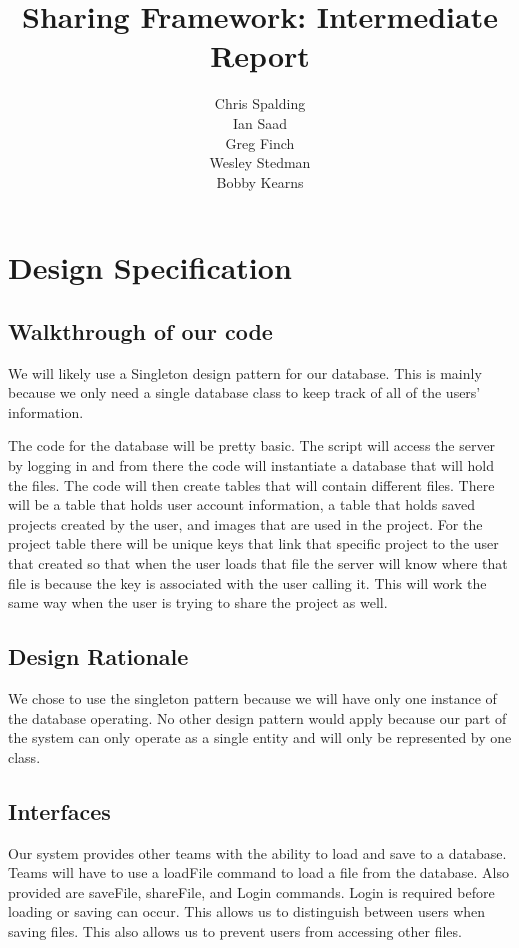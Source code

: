\documentclass[12pt]{article}
\title{Sharing Framework: Intermediate Report}
\author{Chris Spalding\\Ian Saad\\Greg Finch\\Wesley Stedman\\Bobby Kearns}
\begin{document}
\begin{titlepage}
\maketitle
\end{titlepage}

\section{Design Specification}

\subsection{Walkthrough of our code}

We will likely use a Singleton design pattern for our database. This is mainly because we only need a single database class to keep track of all of the users' information.

The code for the database will be pretty basic. The script will access the server by logging in and from there the code will instantiate a database that will hold the files. The code will then create tables that will contain different files. There will be a table that holds user account information, a table that holds saved projects created by the user, and images that are used in the project. For the project table there will be unique keys that link that specific project to the user that created so that when the user loads that file the server will know where that file is because the key is associated with the user calling it. This will work the same way when the user is trying to share the project as well.

\subsection{Design Rationale}

We chose to use the singleton pattern because we will have only one instance of the database operating.  No other design pattern would apply because our part of the system can only operate as a single entity and will only be represented by one class.

\subsection{Interfaces}

Our system provides other teams with the ability to load and save to a database. Teams will have to use a loadFile command to load a file from the database. Also provided are saveFile, shareFile, and Login commands. Login is required before loading or saving can occur. This allows us to distinguish between users when saving files. This also allows us to prevent users from accessing other files.
\end{document}
